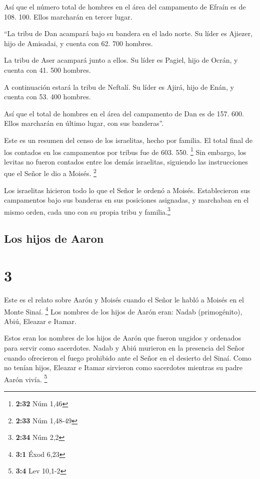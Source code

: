  Así que el número total de hombres en el área del
campamento de Efraín es de 108. 100. Ellos marcharán en tercer lugar.

 ``La tribu de Dan acampará bajo su bandera en el lado
norte. Su líder es Ajiezer, hijo de Amisadai,  y cuenta
con 62. 700 hombres.

 La tribu de Aser acampará junto a ellos. Su líder es
Pagiel, hijo de Ocrán,  y cuenta con 41. 500 hombres.

 A continuación estará la tribu de Neftalí. Su líder es
Ajirá, hijo de Enán,  y cuenta con 53. 400 hombres.

 Así que el total de hombres en el área del campamento de
Dan es de 157. 600. Ellos marcharán en último lugar, con sus banderas''.

 Este es un resumen del censo de los israelitas, hecho
por familia. El total final de los contados en los campamentos por
tribus fue de 603. 550. \footnote{\textbf{2:32} Núm 1,46}
 Sin embargo, los levitas no fueron contados entre los
demás israelitas, siguiendo las instrucciones que el Señor le dio a
Moisés. \footnote{\textbf{2:33} Núm 1,48-49}

 Los israelitas hicieron todo lo que el Señor le ordenó a
Moisés. Establecieron sus campamentos bajo sus banderas en sus
posiciones asignadas, y marchaban en el mismo orden, cada uno con su
propia tribu y familia.\footnote{\textbf{2:34} Núm 2,2}

\hypertarget{los-hijos-de-aaron}{%
\subsection{Los hijos de Aaron}\label{los-hijos-de-aaron}}

\hypertarget{section-2}{%
\section{3}\label{section-2}}

 Este es el relato sobre Aarón y Moisés cuando el Señor le
habló a Moisés en el Monte Sinaí. \footnote{\textbf{3:1} Éxod 6,23}
 Los nombres de los hijos de Aarón eran: Nadab
(primogénito), Abiú, Eleazar e Itamar.

 Estos eran los nombres de los hijos de Aarón que fueron
ungidos y ordenados para servir como sacerdotes.  Nadab y
Abiú murieron en la presencia del Señor cuando ofrecieron el fuego
prohibido ante el Señor en el desierto del Sinaí. Como no tenían hijos,
Eleazar e Itamar sirvieron como sacerdotes mientras su padre Aarón
vivía. \footnote{\textbf{3:4} Lev 10,1-2}

